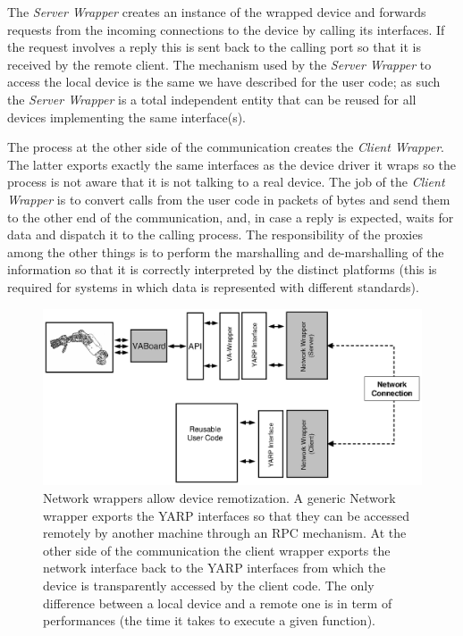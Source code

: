 The \emph{Server Wrapper} creates an instance of the wrapped device and forwards 
requests from the incoming connections to the device by calling its interfaces. 
If the request involves a reply this is sent back to the calling port so that it 
is received by the remote client. The mechanism used by the \emph{Server Wrapper} 
to access the local device is the same we have described for the user code; as 
such the \emph{Server Wrapper} is a total independent entity that can be reused 
for all devices implementing the same interface(s). 

The process at the other side of the communication creates the 
\emph{Client Wrapper}. The latter exports exactly the same interfaces as the 
device driver it wraps so the process is not aware that it is not talking to 
a real device. The job of the \emph{Client Wrapper} is to convert calls from 
the user code in packets of bytes and send them to the other end of the 
communication, and, in case a reply is expected, waits for data and dispatch 
it to the calling process. The responsibility of the proxies among the other 
things is to perform the marshalling and de-marshalling of the information 
so that it is correctly interpreted by the distinct platforms (this is 
required for systems in which data is represented with different standards).

\begin{figure}[tbp]
\centerline{
\includegraphics[width=24cm]{fig-devices3.eps}
}
\caption{Network wrappers allow device remotization. A generic Network 
wrapper exports the YARP interfaces so that they can be accessed remotely 
by another machine through an RPC mechanism. At the other side of the 
communication the client wrapper exports the network interface back 
to the YARP interfaces from which the device is transparently accessed 
by the client code. The only difference between a local device and a 
remote one is in term of performances (the time it takes to execute 
a given function).
}\label{fig:devices3}
\end{figure}

